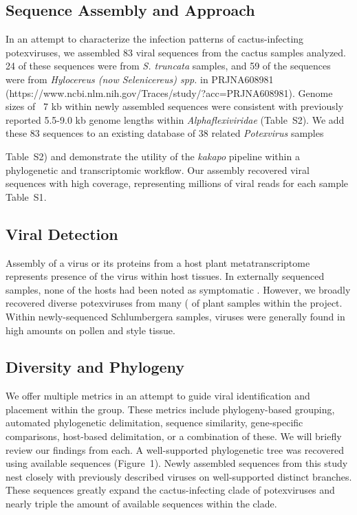 \documentclass[fleqn,10pt,lineno]{wlpeerj}
\begin{document}
\subsection*{Sequence Assembly and Approach}
In an attempt to characterize the infection patterns of cactus-infecting potexviruses, we assembled 83 viral sequences from the cactus samples analyzed. 
24 of these sequences were from \textit{S. truncata} samples, and 59 of the sequences were from \textit{Hylocereus (now Selenicereus) spp.} in PRJNA608981 (https://www.ncbi.nlm.nih.gov/Traces/study/?acc=PRJNA608981)\citep{fan2020retracted}.
Genome sizes of ~7 kb within newly assembled sequences were consistent with previously reported 5.5-9.0 kb genome lengths within \textit{Alphaflexiviridae} \citep{kreuze_ictv_2020,adams2004virology}(Table~S2).
We add these 83 sequences to an existing database of 38 related \textit{Potexvirus} samples {Table~S2) and demonstrate the utility of the \textit{kakapo} pipeline within a phylogenetic and transcriptomic workflow. 
Our assembly recovered viral sequences with high coverage, representing millions of viral reads for each sample {Table~S1}.

 
\subsection*{Viral Detection}
Assembly of a virus or its proteins from a host plant metatranscriptome represents presence of the virus within host tissues. 
In externally sequenced samples, none of the hosts had been noted as symptomatic \citep{fan2020retracted}.
However, we broadly recovered diverse potexviruses from many (%
 of plant samples within the project.
 Within newly-sequenced Schlumbergera samples, viruses were generally found in high amounts on pollen and style tissue.


\subsection*{Diversity and Phylogeny}

We offer multiple metrics in an attempt to guide viral identification and placement within the group. 
These metrics include phylogeny-based grouping, automated phylogenetic delimitation, sequence similarity, gene-specific comparisons, host-based delimitation, or a combination of these. 
We will briefly review our findings from each.
A well-supported phylogenetic tree was recovered using available sequences (Figure~1).
Newly assembled sequences from this study nest closely with previously described viruses on well-supported distinct branches. 
These sequences greatly expand the cactus-infecting clade of potexviruses and nearly triple the amount of available sequences within the clade. 
}
\end{document}
